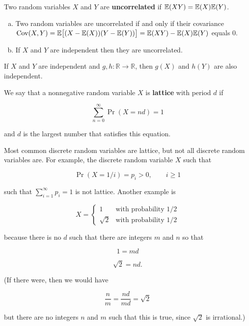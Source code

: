 \begin{definition}Two random variables \(X\) and \(Y\) are \textbf{uncorrelated} if \(\E(XY) = \E(X) \E(Y)\).\end{definition} 

\begin{proposition}
\begin{enumerate}[(a)]
\item Two random variables are uncorrelated if and only if their covariance \(\Cov(X, Y) = \E \big[(X - \E(X))(Y - \E(Y))\big] = \E(XY) - \E(X)\E(Y)\)  equals 0. 
\item If \(X\) and \(Y\) are independent then they are uncorrelated.
\end{enumerate}
\end{proposition}

\begin{theorem} If \(X\) and \(Y\) are independent and \(g, h: \mathbb{R} \to \mathbb{R}\), then \(g(X)\) and \(h(Y)\) are also independent. \end{theorem}

\begin{definition}\label{prob.defn.lattice} We say that a nonnegative random variable \(X\) is \textbf{lattice} with period \(d\) if 

\[
\sum_{n=0}^\infty \Pr(X = nd) = 1
\]

and \(d\) is the largest number that satisfies this equation.

\end{definition}

\begin{remark}Most common discrete random variables are lattice, but not all discrete random variables are. For example, the discrete random variable \(X\) such that

\[
\Pr(X = 1/i) = p_i > 0, \qquad i \geq 1
\]

such that \(\sum_{i=1}^ \infty p_i = 1\) is not lattice. Another example is

\[
X = \begin{cases}
1 & \text{with probability } 1/2 \\
\sqrt{2} & \text{with probability } 1/2
\end{cases}
\]

because there is no \(d\) such that there are integers \(m\) and \(n\) so that

\[
1 = md 
\]

\[
\sqrt{2} = nd.
\]

(If there were, then we would have

\[
 \frac{n}{m} = \frac{nd}{md} = \sqrt{2}
\]

but there are no integers \(n\) and \(m\) such that this is true, since \(\sqrt{2}\) is irrational.)

\end{remark}

